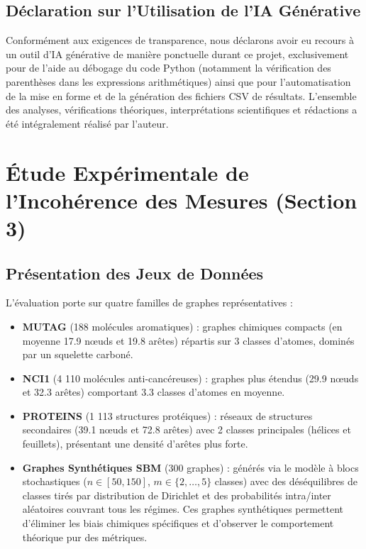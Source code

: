 \documentclass[11pt,a4paper]{article}
\begin{document}
\subsection{Déclaration sur l'Utilisation de l'IA Générative}

Conformément aux exigences de transparence, nous déclarons avoir eu recours à un outil d'IA générative de manière ponctuelle durant ce projet, exclusivement pour de l'aide au débogage du code Python (notamment la vérification des parenthèses dans les expressions arithmétiques) ainsi que pour l'automatisation de la mise en forme et de la génération des fichiers CSV de résultats. L'ensemble des analyses, vérifications théoriques, interprétations scientifiques et rédactions a été intégralement réalisé par l'auteur.

\section{Étude Expérimentale de l'Incohérence des Mesures (Section 3)}

\subsection{Présentation des Jeux de Données}

L'évaluation porte sur quatre familles de graphes représentatives :
\begin{itemize}[leftmargin=1.5em]
    \item \textbf{MUTAG} (188 molécules aromatiques) : graphes chimiques compacts (en moyenne 17.9 nœuds et 19.8 arêtes) répartis sur 3 classes d'atomes, dominés par un squelette carboné.
    \item \textbf{NCI1} (4 110 molécules anti-cancéreuses) : graphes plus étendus (29.9 nœuds et 32.3 arêtes) comportant 3.3 classes d'atomes en moyenne.
    \item \textbf{PROTEINS} (1 113 structures protéiques) : réseaux de structures secondaires (39.1 nœuds et 72.8 arêtes) avec 2 classes principales (hélices et feuillets), présentant une densité d'arêtes plus forte.
    \item \textbf{Graphes Synthétiques SBM} (300 graphes) : générés via le modèle à blocs stochastiques ($n \in [50, 150]$, $m \in \{2, \dots, 5\}$ classes) avec des déséquilibres de classes tirés par distribution de Dirichlet et des probabilités intra/inter aléatoires couvrant tous les régimes. Ces graphes synthétiques permettent d'éliminer les biais chimiques spécifiques et d'observer le comportement théorique pur des métriques.
\end{itemize}
\end{document}

